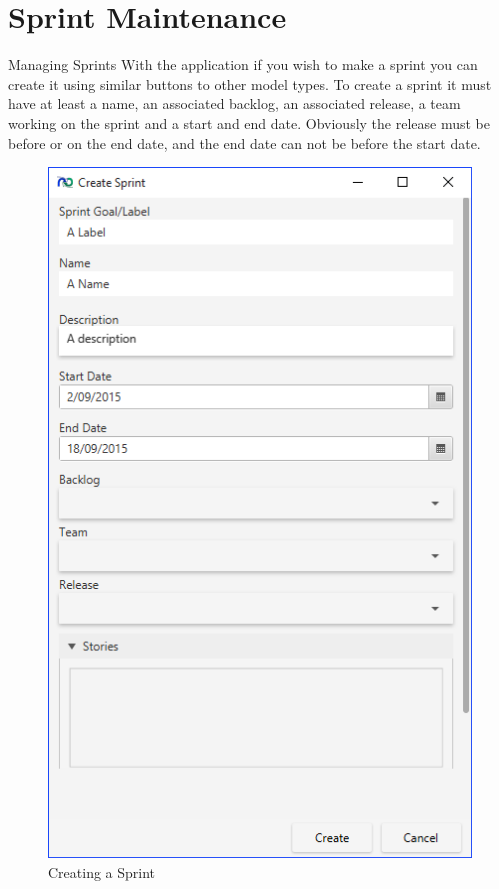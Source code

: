 \section{Sprint Maintenance}

Managing Sprints
\newline\newline
With the application if you wish to make a sprint you can create it using similar buttons to other model types. To create a sprint it must have at least a name, an associated backlog, an associated release, a team working on the sprint and a start and end date. Obviously the release must be before or on the end date, and the end date can not be before the start date.

\begin{figure}[H]
\centering
\includegraphics[width=\textwidth]{images/screenshots/sprint1.PNG}
\caption{Creating a Sprint}
\label{fig:new_project}
\end{figure}

